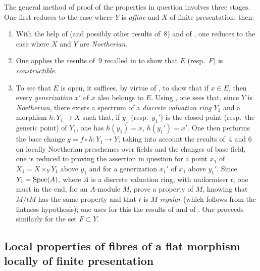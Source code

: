 \begin{env}[12.0.2]
\label{IV.12.0.2}
The general method of proof of the properties in question involves three stages.
One first reduces to the case where $Y$ is \emph{affine} and $X$ of finite presentation; then:

\medskip
\begin{enumerate}[label=\Alph*)]
  \item With the help of  (and possibly other results of \textsection\,8) and of , one reduces to the case where $X$ and $Y$ are \emph{Noetherian}.

  \item One applies the results of \textsection\,9 recalled in  to show that $E$ (resp.\ $F$) is \emph{constructible}.

  \item To see that $E$ is open, it suffices, by virtue of , to show that if $x\in E$, then every \emph{generization} $x'$ of $x$ also belongs to $E$.
Using , one sees that, since $Y$ is \emph{Noetherian}, there exists a spectrum of a \emph{discrete valuation ring} $Y_1$ and a morphism $h:Y_1\to X$ such that, if $y_1$ (resp.\ $y_1'$) is the closed point (resp.\ the generic point) of $Y_1$, one has $h(y_1)=x$, $h(y_1')=x'$.
One then performs the base change $g=f\circ h:Y_1\to Y$; taking into account the results of \textsection\textsection\,4 and 6 on locally Noetherian preschemes over fields and the changes of base field, one is reduced to proving the assertion in question for a point $x_1$ of $X_1=X\times_{Y}Y_1$ above $y_1$ and for a generization $x_1'$ of $x_1$ above $y_1'$.
Since $Y_1=\operatorname{Spec}(A)$, where $A$ is a discrete valuation ring, with uniformiser $t$, one must in the end, for an $A$-module $M$, prove a property of $M$, knowing that $M/tM$ has the same property and that $t$ is $M$-\emph{regular} (which follows from the flatness hypothesis); one uses for this the results of  and of .
One proceeds similarly for the set $F\subset Y$.
\end{enumerate}
\end{env}


\subsection{Local properties of fibres of a flat morphism locally of finite presentation}
\label{subsection:IV.12.1}

